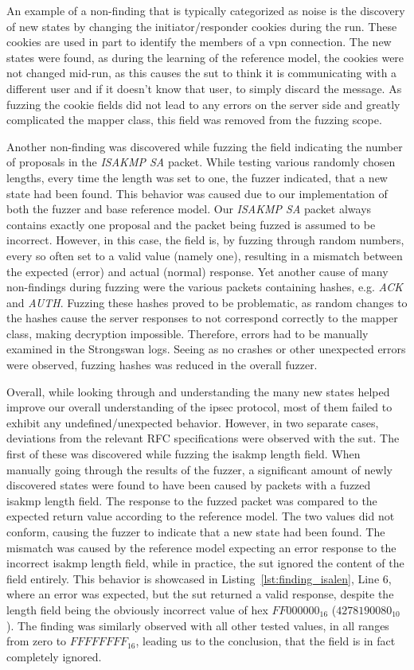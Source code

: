 An example of a non-finding that is typically categorized as noise is the discovery of new states by changing the initiator/responder cookies during the run. These cookies are used in part to identify the members of a \ac{vpn} connection. The new states were found, as during the learning of the reference model, the cookies were not changed mid-run, as this causes the \ac{sut} to think it is communicating with a different user and if it doesn't know that user, to simply discard the message. As fuzzing the cookie fields did not lead to any errors on the server side and greatly complicated the mapper class, this field was removed from the fuzzing scope. 

Another non-finding was discovered while fuzzing the field indicating the number of proposals in the \emph{ISAKMP SA} packet. While testing various randomly chosen lengths, every time the length was set to one, the fuzzer indicated, that a new state had been found. This behavior was caused due to our implementation of both the fuzzer and base reference model. Our \emph{ISAKMP SA} packet always contains exactly one proposal and the packet being fuzzed is assumed to be incorrect. However, in this case, the field is, by fuzzing through random numbers, every so often set to a valid value (namely one), resulting in a mismatch between the expected (error) and actual (normal) response. Yet another cause of many non-findings during fuzzing were the various packets containing hashes, e.g. \emph{ACK} and \emph{AUTH}. Fuzzing these hashes proved to be problematic, as random changes to the hashes cause the server responses to not correspond correctly to the mapper class, making decryption impossible. Therefore, errors had to be manually examined in the Strongswan logs. Seeing as no crashes or other unexpected errors were observed, fuzzing hashes was reduced in the overall fuzzer. 

Overall, while looking through and understanding the many new states helped improve our overall understanding of the \ac{ipsec} protocol, most of them failed to exhibit any undefined/unexpected behavior. However, in two separate cases, deviations from the relevant RFC specifications were observed with the \ac{sut}. The first of these was discovered while fuzzing the \ac{isakmp} length field. When manually going through the results of the fuzzer, a significant amount of newly discovered states were found to have been caused by packets with a fuzzed \ac{isakmp} length field. The response to the fuzzed packet was compared to the expected return value according to the reference model. The two values did not conform, causing the fuzzer to indicate that a new state had been found. The mismatch was caused by the reference model expecting an error response to the incorrect \ac{isakmp} length field, while in practice, the \ac{sut} ignored the content of the field entirely. This behavior is showcased in Listing~\ref{lst:finding_isalen}, Line 6, where an error was expected, but the \ac{sut} returned a valid response, despite the length field being the obviously incorrect value of hex $FF000000_{16}$ ($4278190080_{10}$). The finding was similarly observed with all other tested values, in all ranges from zero to $FFFFFFFF_{16}$, leading us to the conclusion, that the field is in fact completely ignored.

